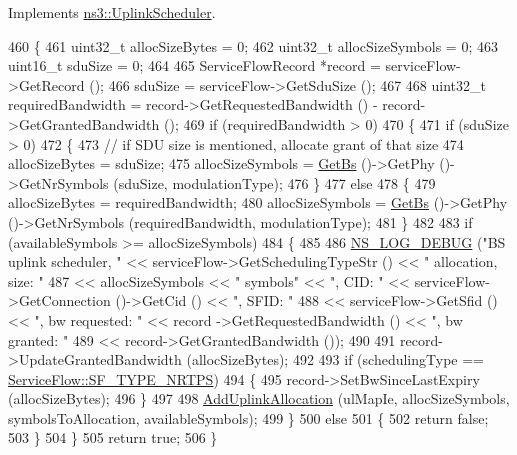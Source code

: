 Implements \hyperlink{classns3_1_1UplinkScheduler_a6e702b7f0bdb490a762b5e2b9b13c362}{ns3\+::\+Uplink\+Scheduler}.


\begin{DoxyCode}
460 \{
461   uint32\_t allocSizeBytes = 0;
462   uint32\_t allocSizeSymbols = 0;
463   uint16\_t sduSize = 0;
464 
465   ServiceFlowRecord *record = serviceFlow->GetRecord ();
466   sduSize = serviceFlow->GetSduSize ();
467 
468   uint32\_t requiredBandwidth = record->GetRequestedBandwidth () - record->GetGrantedBandwidth ();
469   \textcolor{keywordflow}{if} (requiredBandwidth > 0)
470     \{
471       \textcolor{keywordflow}{if} (sduSize > 0)
472         \{
473           \textcolor{comment}{// if SDU size is mentioned, allocate grant of that size}
474           allocSizeBytes = sduSize;
475           allocSizeSymbols = \hyperlink{classns3_1_1UplinkScheduler_afe61b7de71d92d2dff1b135744a6ff7e}{GetBs} ()->GetPhy ()->GetNrSymbols (sduSize, modulationType);
476         \}
477       \textcolor{keywordflow}{else}
478         \{
479           allocSizeBytes = requiredBandwidth;
480           allocSizeSymbols = \hyperlink{classns3_1_1UplinkScheduler_afe61b7de71d92d2dff1b135744a6ff7e}{GetBs} ()->GetPhy ()->GetNrSymbols (requiredBandwidth, modulationType);
481         \}
482 
483       \textcolor{keywordflow}{if} (availableSymbols >= allocSizeSymbols)
484         \{
485 
486           \hyperlink{group__logging_ga413f1886406d49f59a6a0a89b77b4d0a}{NS\_LOG\_DEBUG} (\textcolor{stringliteral}{"BS uplink scheduler, "} << serviceFlow->GetSchedulingTypeStr () << \textcolor{stringliteral}{"
       allocation, size: "}
487                                                 << allocSizeSymbols << \textcolor{stringliteral}{" symbols"} << \textcolor{stringliteral}{", CID: "} << 
      serviceFlow->GetConnection ()->GetCid () << \textcolor{stringliteral}{", SFID: "}
488                                                 << serviceFlow->GetSfid () << \textcolor{stringliteral}{", bw requested: "} << record
      ->GetRequestedBandwidth () << \textcolor{stringliteral}{", bw granted: "}
489                                                 << record->GetGrantedBandwidth ());
490 
491           record->UpdateGrantedBandwidth (allocSizeBytes);
492 
493           \textcolor{keywordflow}{if} (schedulingType == \hyperlink{classns3_1_1ServiceFlow_a7990ba10be1e098328fd1e6382a26235a7f8577f851a9f01d159442a3a3fcdf48}{ServiceFlow::SF\_TYPE\_NRTPS})
494             \{
495               record->SetBwSinceLastExpiry (allocSizeBytes);
496             \}
497 
498           \hyperlink{classns3_1_1UplinkSchedulerRtps_aea8d8f5701bf3b5f992d1b43471340d2}{AddUplinkAllocation} (ulMapIe, allocSizeSymbols, symbolsToAllocation, 
      availableSymbols);
499         \}
500       \textcolor{keywordflow}{else}
501         \{
502           \textcolor{keywordflow}{return} \textcolor{keyword}{false};
503         \}
504     \}
505   \textcolor{keywordflow}{return} \textcolor{keyword}{true};
506 \}
\end{DoxyCode}


